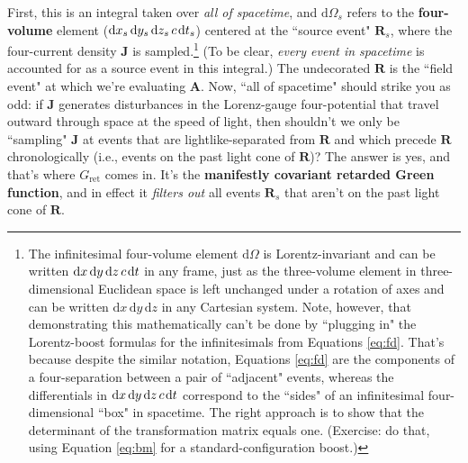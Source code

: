 \documentclass[12pt]{article}
\renewcommand{\vv}[1]{\mathbf{#1}}
\newcommand{\dd}[1]{\mathrm{d}#1}
\begin{document}
First, this is an integral taken over \emph{all of spacetime}, and $\dd \Omega_{s}$ refers to the \textbf{four-volume} element ($\dd x_{s} \, \dd y_{s} \, \dd z_{s} \, c \mkern2mu \dd t_{s}$) centered at the ``source event" $\vv R _{s}$, where the four-current density $\vv J$ is sampled.\footnote{The infinitesimal four-volume element $\dd \Omega$ is Lorentz-invariant and can be written $\dd x \, \dd y \, \dd z \, c \mkern2mu \dd t$ in any frame, just as the three-volume element in three-dimensional Euclidean space is left unchanged under a rotation of axes and can be written $\dd x \, \dd y \, \dd z$ in any Cartesian system. Note, however, that demonstrating this mathematically can't be done by ``plugging in" the Lorentz-boost formulas for the infinitesimals from Equations \ref{eq:fd}. That's because despite the similar notation, Equations \ref{eq:fd} are the components of a four-separation between a pair of ``adjacent" events, whereas the differentials in $\dd x \, \dd y \, \dd z \, c \mkern2mu \dd t$ correspond to the ``sides" of an infinitesimal four-dimensional ``box" in spacetime. The right approach is to show that the determinant of the transformation matrix equals one. (Exercise: do that, using Equation \ref{eq:bm} for a standard-configuration boost.)} (To be clear, \emph{every event in spacetime} is accounted for as a source event in this integral.) The undecorated $\vv R$ is the ``field event" at which we're evaluating $\vv A$. Now, ``all of spacetime" should strike you as odd: if $\vv J$ generates disturbances in the Lorenz-gauge four-potential that travel outward through space at the speed of light, then shouldn't we only be ``sampling" $\vv J$ at events that are lightlike-separated from $\vv R$ and which precede $\vv R$ chronologically (i.e., events on the past light cone of $\vv R$)? The answer is yes, and that's where $G_{\textrm{ret}}$ comes in. It's the \textbf{manifestly covariant retarded Green function}, and in effect it \emph{filters out} all events $\vv R_{s}$ that aren't on the past light cone of $\vv R$.
\end{document}

